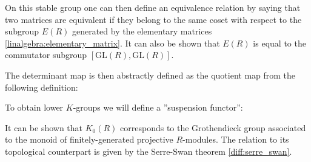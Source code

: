     On this stable group one can then define an equivalence relation by saying that two matrices are equivalent if they belong to the same coset with respect to the subgroup $E(R)$ generated by the elementary matrices \ref{linalgebra:elementary_matrix}. It can also be shown that $E(R)$ is equal to the commutator subgroup $[\text{GL}(R), \text{GL}(R)]$.

    The determinant map is then abstractly defined as the quotient map from the following definition:

    To obtain lower $K$-groups we will define a ''suspension functor'':

    \begin{example}[$K_0$]
        It can be shown that $K_0(R)$ corresponds to the Grothendieck group associated to the monoid of finitely-generated projective $R$-modules. The relation to its topological counterpart is given by the Serre-Swan theorem \ref{diff:serre_swan}.
    \end{example}